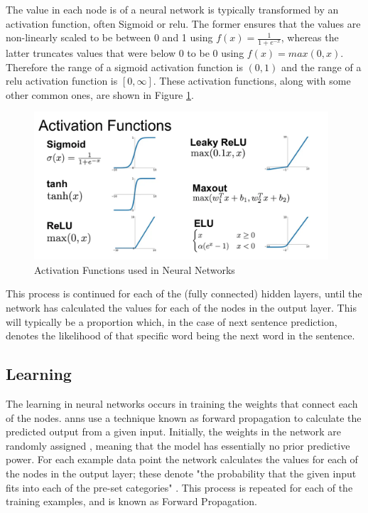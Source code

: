 The value in each node is of a neural network is typically transformed by an activation function, often Sigmoid or \acrfull{relu}. The former ensures that the values are non-linearly scaled to be between 0 and 1 using $f(x) = \frac{1}{1+e^{-x}}$, whereas the latter truncates values that were below 0 to be 0 using $f(x) = max(0, x)$. Therefore the range of a sigmoid activation function is $(0, 1)$ and the range of a \acrshort{relu} activation function is $[0, \infty]$. These activation functions, along with some other common ones, are shown in Figure \ref{fig:activation_functions}.

\begin{figure}[h]
    \centering
    \includegraphics[height=5.5cm,trim={0 0 0 3.5cm},clip]{Paper/images/activation_functions.png}
    \caption{Activation Functions used in Neural Networks \citep{Udofia}}
    \label{fig:activation_functions}
\end{figure}

This process is continued for each of the (fully connected) hidden layers, until the network has calculated the values for each of the nodes in the output layer. This will typically be a proportion which, in the case of next sentence prediction, denotes the likelihood of that specific word being the next word in the sentence.

\subsection{Learning}
\label{sec:background_anns_learning}
The learning in neural networks occurs in training the weights that connect each of the nodes. \acrlong{ann}s use a technique known as forward propagation to calculate the predicted output from a given input. Initially, the weights in the network are randomly assigned \citep{Bishop}, meaning that the model has essentially no prior predictive power. For each example data point the network calculates the values for each of the nodes in the output layer; these denote "the probability that the given input fits into each of the pre-set categories" \citep{Yathish}. This process is repeated for each of the training examples, and is known as Forward Propagation. 

